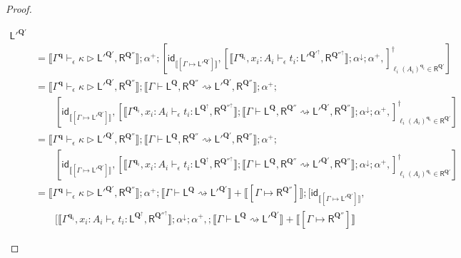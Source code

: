 \documentclass[acmsmall,screen,anonymous,review]{acmart}
\newcommand{\mb}[1]{\ensuremath{\mathbf{#1}}}
\newcommand{\ms}[1]{\ensuremath{\mathsf{#1}}}
\newcommand{\lwk}[3]{#1 \vdash #2 \rightsquigarrow #3}
\newcommand{\hasty}[4]{#1 \vdash_{#2} #3: {#4}}
\newcommand{\haslb}[4]{#1 \vdash_{#2} #3 \rhd #4}
\newcommand{\ltoty}[2]{[#1 \mapsto #2]}
\newcommand{\dnt}[1]{\llbracket{#1}\rrbracket}
\newcommand{\zeroqv}[1]{#1^\uparrow}
\begin{document}
\begin{proof}
\begin{itemize}
\begin{align*}
{      {\ms{L}'^{\mb{Q}'}}} \\
    & = \dnt{\haslb{\Gamma^{\mb{q}}}{\epsilon}{\kappa}
      {\ms{L}'^{\mb{Q}'}, \ms{R}^{\mb{Q}''}}} ; \alpha^+ ; [
      \ms{id}_{\dnt{\ltoty{\Gamma}{\ms{L}'^{\mb{Q}'}}}},
      [
        \dnt{\hasty{\Gamma^{\mb{q}_i}, x_i : A_i}{\epsilon}{t_i}
          {\ms{L}'^{\zeroqv{\mb{Q}'}}, \ms{R}^{\zeroqv{\mb{Q}''}}}} ; \alpha^\downarrow ; \alpha^+,
      ]_{\ell_i(A_i)^{\mb{q}_i} \in \ms{R}^{\mb{Q}'}}^\dagger
    ] \\
    & = \dnt{\haslb{\Gamma^{\mb{q}}}{\epsilon}{\kappa}{\ms{L}'^{\mb{Q}'}, \ms{R}^{\mb{Q}''}}}
      ; \dnt{\lwk{\Gamma}{\ms{L}^{\mb{Q}}, \ms{R}^{\mb{Q}''}}{\ms{L}'^{\mb{Q}'}, \ms{R}^{\mb{Q}''}}}
      ; \alpha^+
      ; \\ & \qquad [
      \ms{id}_{\dnt{\ltoty{\Gamma}{\ms{L}'^{\mb{Q}'}}}},
      [
        \dnt{\hasty{\Gamma^{\mb{q}_i}, x_i : A_i}{\epsilon}{t_i}
          {\ms{L}^{\zeroqv{\mb{Q}}}, \ms{R}^{\zeroqv{\mb{Q}''}}}} 
        ; \dnt{\lwk{\Gamma}{\ms{L}^{\mb{Q}}, \ms{R}^{\mb{Q}''}}
            {\ms{L}'^{\mb{Q}'}, \ms{R}^{\mb{Q}''}}}
        ; \alpha^\downarrow ; \alpha^+,
      ]_{\ell_i(A_i)^{\mb{q}_i} \in \ms{R}^{\mb{Q}'}}^\dagger
    ] \\
    & = \dnt{\haslb{\Gamma^{\mb{q}}}{\epsilon}{\kappa}{\ms{L}'^{\mb{Q}'}, \ms{R}^{\mb{Q}''}}}
      ; \dnt{\lwk{\Gamma}{\ms{L}^{\mb{Q}}, \ms{R}^{\mb{Q}''}}{\ms{L}'^{\mb{Q}'}, \ms{R}^{\mb{Q}''}}}
      ; \alpha^+
      ; \\ & \qquad [
      \ms{id}_{\dnt{\ltoty{\Gamma}{\ms{L}'^{\mb{Q}'}}}},
      [
        \dnt{\hasty{\Gamma^{\mb{q}_i}, x_i : A_i}{\epsilon}{t_i}
          {\ms{L}^{\zeroqv{\mb{Q}}}, \ms{R}^{\zeroqv{\mb{Q}''}}}} 
        ; \dnt{\lwk{\Gamma}{\ms{L}^{\mb{Q}}, \ms{R}^{\mb{Q}''}}
            {\ms{L}'^{\mb{Q}'}, \ms{R}^{\mb{Q}''}}}
        ; \alpha^\downarrow ; \alpha^+,
      ]_{\ell_i(A_i)^{\mb{q}_i} \in \ms{R}^{\mb{Q}'}}^\dagger
    ] \\
    & = \dnt{\haslb{\Gamma^{\mb{q}}}{\epsilon}{\kappa}{\ms{L}'^{\mb{Q}'}, \ms{R}^{\mb{Q}''}}}
      ; \alpha^+
      ; \dnt{\lwk{\Gamma}{\ms{L}^{\mb{Q}}}{\ms{L}'^{\mb{Q}'}}} 
        + \dnt{\ltoty{\Gamma}{\ms{R}^{\mb{Q}''}}}
      ; [
      \ms{id}_{\dnt{\ltoty{\Gamma}{\ms{L}'^{\mb{Q}'}}}}, \\ & \qquad
      [
        \dnt{\hasty{\Gamma^{\mb{q}_i}, x_i : A_i}{\epsilon}{t_i}
          {\ms{L}^{\zeroqv{\mb{Q}}}, \ms{R}^{\zeroqv{\mb{Q}''}}}}
        ; \alpha^\downarrow ; \alpha^+,
        ; \dnt{\lwk{\Gamma}{\ms{L}^{\mb{Q}}}{\ms{L}'^{\mb{Q}'}}} 
        + \dnt{\ltoty{\Gamma}{\ms{R}^{\mb{Q}''}}}

\end{align*}
\end{itemize}
\end{proof}
\end{document}
